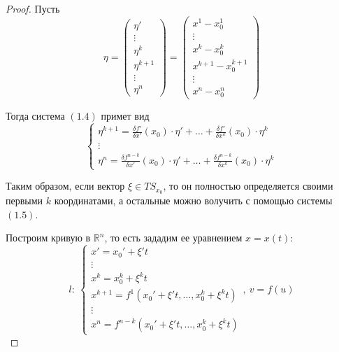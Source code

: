 \documentclass{report}
\theoremstyle{definition}
\begin{document}
\begin{proof}
  Пусть
  \begin{equation*}
    \eta = \left(\begin{array}{c}
      \eta'      \\
      \vdots     \\
      \eta^k     \\
      \eta^{k+1} \\
      \vdots     \\
      \eta^n
    \end{array}\right) = \left(\begin{array}{c}
      x^1 - x_0^1         \\
      \vdots              \\
      x^k - x_0^k         \\
      x^{k+1} - x^{k+1}_0 \\
      \vdots              \\
      x^n - x_0^n
    \end{array}\right)
  \end{equation*}

  Тогда система $(1.4)$ примет вид
  \begin{equation}
    \left\{\begin{array}{l}
      \eta^{k+1} = \frac{\delta f'}{\delta x'}(x_0) \cdot \eta' + \ldots + \frac{\delta f'}{\delta x^k}(x_0)\cdot \eta^k \\
      \vdots                                                                                                             \\
      \eta^{n} = \frac{\delta f^{n-k}}{\delta x'}(x_0) \cdot \eta' + \ldots + \frac{\delta f^{n-k}}{\delta x^k}(x_0)\cdot \eta^k
    \end{array}\right.
  \end{equation}

  Таким образом, если вектор $\xi \in TS_{x_0}$, то он полностью определяется своими первыми $k$ координатами, а остальные можно волучить с помощью системы $(1.5)$.

  Построим кривую в $\mathbb{R}^n$, то есть зададим ее уравнением $x = x(t)$:
  \begin{equation}
    l: \ \left\{\begin{array}{l}
      x' = x_0' + \xi't                                     \\
      \vdots                                                \\
      x^k = x_0^k + \xi^k t                                 \\
      x^{k+1} = f^1(x_0' + \xi' t, \ldots, x_0^k + \xi^k t) \\
      \vdots                                                \\
      x^{n} = f^{n-k}(x_0' + \xi' t, \ldots, x_0^k + \xi^k t)
    \end{array}\right., \ v = f(u)
  \end{equation}


\end{proof}
\end{document}
